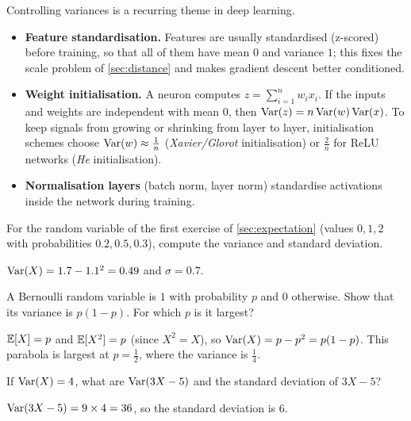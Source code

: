 \begin{mlnote}
Controlling variances is a recurring theme in deep learning.
\begin{itemize}
  \item \textbf{Feature standardisation.} Features are usually standardised
    (z-scored) before training, so that all of them have mean $0$ and variance
    $1$; this fixes the scale problem of \cref{sec:distance} and makes gradient
    descent better conditioned.
  \item \textbf{Weight initialisation.} A neuron computes
    $z = \sum_{i=1}^n w_ix_i$. If the inputs and weights are independent with mean
    $0$, then $\operatorname{Var}(z) = n\operatorname{Var}(w)\operatorname{Var}(x)$. To keep signals from growing or
    shrinking from layer to layer, initialisation schemes choose
    $\operatorname{Var}(w) \approx \frac1n$ (\emph{Xavier/Glorot} initialisation) or
    $\frac2n$ for ReLU networks (\emph{He} initialisation).
  \item \textbf{Normalisation layers} (batch norm, layer norm) standardise
    activations inside the network during training.
\end{itemize}
\end{mlnote}

\sectionexercises

\begin{exercise}
For the random variable of the first exercise of \cref{sec:expectation}
(values $0, 1, 2$ with probabilities $0.2, 0.5, 0.3$), compute the variance and
standard deviation.
\end{exercise}
\begin{solution}
$\operatorname{Var}(X) = 1.7 - 1.1^2 = 0.49$ and $\sigma = 0.7$.
\end{solution}

\begin{exercise}
A Bernoulli random variable is $1$ with probability $p$ and $0$ otherwise. Show
that its variance is $p(1-p)$. For which $p$ is it largest?
\end{exercise}
\begin{solution}
$\mathbb{E}[X] = p$ and $\mathbb{E}[X^2] = p$ (since $X^2 = X$), so $\operatorname{Var}(X) = p - p^2 = p(1-p)$.
This parabola is largest at $p = \tfrac12$, where the variance is $\tfrac14$.
\end{solution}

\begin{exercise}
If $\operatorname{Var}(X) = 4$, what are $\operatorname{Var}(3X - 5)$ and the standard deviation of
$3X - 5$?
\end{exercise}
\begin{solution}
$\operatorname{Var}(3X - 5) = 9\times4 = 36$, so the standard deviation is $6$.
\end{solution}

